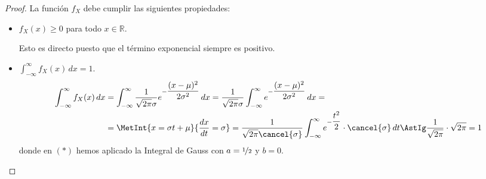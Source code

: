 \begin{proof}
    La función $f_X$ debe cumplir las siguientes propiedades:
    \begin{itemize}
        \item $f_X(x)\geq 0$ para todo $x\in \mathbb{R}$.
        
        Esto es directo puesto que el término exponencial siempre es positivo.
        
        \item $\displaystyle \int_{-\infty}^{\infty} f_X(x) \, dx = 1$.
        \begin{align*}
            \int_{-\infty}^{\infty} f_X(x) \, dx &= \int_{-\infty}^{\infty} \dfrac{1}{\sqrt{2\pi}\sigma} e^{-\dfrac{(x-\mu)^2}{2\sigma^2}} \, dx = \dfrac{1}{\sqrt{2\pi}\sigma} \int_{-\infty}^{\infty} e^{-\dfrac{(x-\mu)^2}{2\sigma^2}} \, dx =\\
            &= \MetInt{x=\sigma t +\mu}{\dfrac{dx}{dt} = \sigma} = \dfrac{1}{\sqrt{2\pi}\cancel{\sigma}} \int_{-\infty}^{\infty} e^{-\dfrac{t^2}{2}} \cdot \cancel{\sigma}\, dt \AstIg \dfrac{1}{\sqrt{2\pi}} \cdot \sqrt{2\pi} = 1
        \end{align*}
        donde en $(\ast)$ hemos aplicado la Integral de Gauss con $a=\nicefrac{1}{2}$ y $b=0$.
    \end{itemize}
\end{proof}


